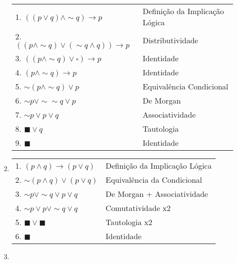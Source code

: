 \documentclass[12pt, a4paper,final]{article}
\begin{document}
\begin{enumerate}
\begin{enumerate}[label=(\alph*)]
                \begin{tabular}{ll}
                    1. $((p \vee q) \wedge \sim q) \rightarrow p$ &  Definição da Implicação Lógica \\
                    2. $((p \wedge \sim q) \vee (\sim q \wedge q)) \rightarrow p$ & Distributividade \\
                    3. $((p \wedge \sim q) \vee \square) \rightarrow p$ & Identidade \\
                    4. $(p \wedge \sim q) \rightarrow p$ & Identidade \\
                    5. $\sim (p \wedge \sim q) \vee p$ & Equivalência Condicional \\
                    6. $\sim p \vee \sim \sim q \vee p$ & De Morgan \\
                    7. $\sim p \vee p \vee q$ & Associatividade \\
                    8. $\blacksquare \vee q$ & Tautologia \\
                    9. $\blacksquare$ & Identidade \\
                \end{tabular}
            
            \item 
            
                \begin{tabular}{ll}
                    1. $(p \wedge q) \rightarrow (p \vee q)$ & Definição da Implicação Lógica \\
                    2. $\sim(p \wedge q) \vee (p \vee q)$ & Equivalência da Condicional \\
                    3. $\sim p \vee \sim q \vee p \vee q$ & De Morgan + Associatividade \\ 
                    4. $\sim p \vee p \vee \sim q \vee q$ & Comutatividade x2 \\
                    5. $\blacksquare \vee \blacksquare$ & Tautologia x2 \\
                    6. $\blacksquare$ & Identidade \\
                \end{tabular}
            
            \item 
            

\end{enumerate}
\end{enumerate}
\end{document}
